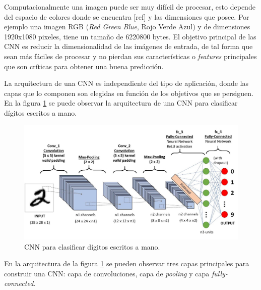 Computacionalmente una imagen puede ser muy difícil de procesar, esto depende del espacio de colores donde se encuentra [ref] y las dimensiones que posee. Por ejemplo una imagen RGB (\textit{Red Green Blue}, Rojo Verde Azul) y de dimensiones 1920x1080 pixeles, tiene un tamaño de 6220800 bytes. El objetivo principal de las CNN es reducir la dimensionalidad de las imágenes de entrada, de tal forma que sean más fáciles de procesar y no pierdan sus características o \textit{features} principales que son críticas para obtener una buena predicción.

La arquitectura de una CNN es independiente del tipo de aplicación, donde las capas que lo componen son elegidas en función de los objetivos que se persiguen. En la figura \ref{fig:cnn_arch} se puede observar la arquitectura de una CNN para clasificar dígitos escritos a mano.

\begin{figure}[h]
	\centering
	\includegraphics[scale=0.35]{./Figures/cnn_arch.jpeg}
	\caption{CNN para clasificar dígitos escritos a mano\protect\footnotemark.}
	\label{fig:cnn_arch}
\end{figure}

En la arquitectura de la figura \ref{fig:cnn_arch} se pueden observar tres capas principales para construir una CNN: capa de convoluciones, capa de \textit{pooling} y capa \textit{fully-connected}.

